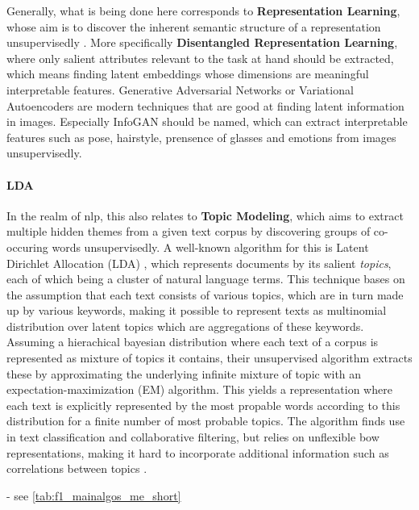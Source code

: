 Generally, what is being done here corresponds to \textbf{Representation Learning}, whose aim is to discover the inherent semantic structure of a representation unsupervisedly \cite{Dayan1995}. More specifically \textbf{Disentangled Representation Learning}, where only salient attributes relevant to the task at hand should be extracted, which means finding latent embeddings whose dimensions are meaningful interpretable features. Generative Adversarial Networks \cite{Goodfellow2014} or Variational Autoencoders \cite{Kingma2013} are modern techniques that are good at finding latent information in images. Especially InfoGAN \cite{Chen2016} should be named, which can extract interpretable features such as pose, hairstyle, prensence of glasses and emotions from images unsupervisedly. 

\paragraph{LDA} 
\label{sec:lda}

In the realm of \gls{nlp}, this also relates to \textbf{Topic Modeling}, which aims to extract multiple hidden themes from a given text corpus by discovering groups of co-occuring words unsupervisedly. A well-known algorithm for this is Latent Dirichlet Allocation (LDA) \cite{Blei2003}, which represents documents by its salient \textit{topics}, each of which being a cluster of natural language terms. This technique bases on the assumption that each text consists of various topics, which are in turn made up by various keywords, making it possible to represent texts as multinomial distribution over latent topics which are aggregations of these keywords. Assuming a hierachical bayesian distribution where each text of a corpus is represented as mixture of topics it contains, their unsupervised algorithm extracts these by approximating the underlying infinite mixture of topic with an expectation-maximization (EM) algorithm. This yields a representation where each text is explicitly represented by the most propable words according to this distribution for a finite number of most probable topics. The algorithm finds use in text classification and collaborative filtering, but relies on unflexible \gls{bow} representations, making it hard to incorporate additional information such as correlations between topics \cite{Ager2018}.

 - see \autoref{tab:f1_mainalgos_me_short}


